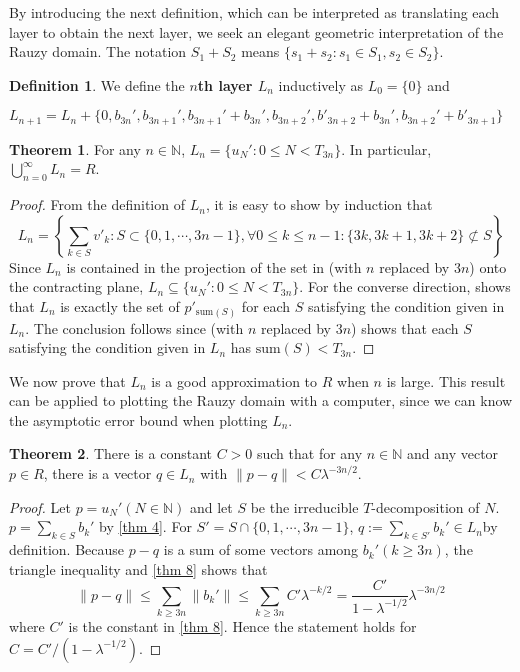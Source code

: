 \documentclass{article}
\theoremstyle{definition}
\newtheorem{theorem}{Theorem}
\newtheorem*{definition}{Definition}
\begin{document}
By introducing the next definition, which can be interpreted as translating each layer to obtain the next layer, we seek an elegant geometric interpretation of the Rauzy domain. The notation $S_1+S_2$ means $\{s_1+s_2:s_1\in S_1,  s_2\in S_2\}$.


\begin{definition}
    We define the \textbf{$n$th layer $L_n$} inductively as $L_0=\{0\} $ and
    \begin{center}
        $L_{n+1}=L_n+\{0, b_{3n}', b_{3n+1}', b_{3n+1}'+b_{3n}',b_{3n+2}', b'_{3n+2}+b_{3n}',b_{3n+2}'+b'_{3n+1}\}$
    \end{center}
\end{definition}
\begin{theorem}
\label{thm 10}
For any $n\in \mathbb{N}$, $L_n=\{u_N':0\leq N< T_{3n}\}$. In particular, $\bigcup_{n=0}^\infty L_n=R$.
\end{theorem}
\begin{proof}
    From the definition of $L_n$, it is easy to show by induction that \[
    L_n=\left\{\sum_{k\in S}v'_k : S\subset\{0,1,\cdots,3n-1\}, \forall 0\leq k\leq n-1:\{3k, 3k+1, 3k+2\} \not\subset S \right\}
    \]
    Since $L_n$ is contained in the projection of the set in  (with $n$ replaced by $3n$) onto the contracting plane, $L_n\subseteq \{u_N':0\leq N< T_{3n}\}$. For the converse direction,  shows that $L_n$ is exactly the set of $p'_{\text{sum}(S)}$ for each $S$ satisfying the condition given in $L_n$. The conclusion follows since  (with $n$ replaced by $3n$) shows that each $S$ satisfying the condition given in $L_n$ has $\text{sum}(S)<T_{3n}$. 
\end{proof}

We now prove that $L_n$ is a good approximation to $R$ when $n$ is large. This result can be applied to plotting the Rauzy domain with a computer, since we can know the asymptotic error bound when plotting $L_n$.

\begin{theorem}
\label {thm 11}
There is a constant $C>0$ such that for any $n\in\mathbb{N}$ and any vector $p\in R$, there is a vector $q\in L_n$ with $\| p-q\|<C\lambda^{-3n/2}$.
\end{theorem}

\begin{proof}
Let $p=u_N'(N\in\mathbb{N})$ and let $S$ be the irreducible $T$-decomposition of $N$. $p=\sum_{k\in S}b_k'$ by \cref{thm 4}. For $S'=S\cap\{0,1,\cdots,3n-1\}$, $q:=\sum_{k\in S'}b_k'\in L_n$by definition. Because $p-q$ is a sum of some vectors among $b_{k}'(k\geq 3n)$, the triangle inequality and \cref{thm 8} shows that
\[
\|p-q\|\leq\sum_{k\geq 3n}\|b_k' \|\leq\sum_{k\geq 3n}C'\lambda^{-k/2}=\frac{C'}{1-\lambda^{-1/2}}\lambda^{-3n/2}
\]
where $C'$ is the constant in \cref{thm 8}. Hence the statement holds for $C=C'/(1-\lambda^{-1/2})$.
\end{proof}
\end{document}
